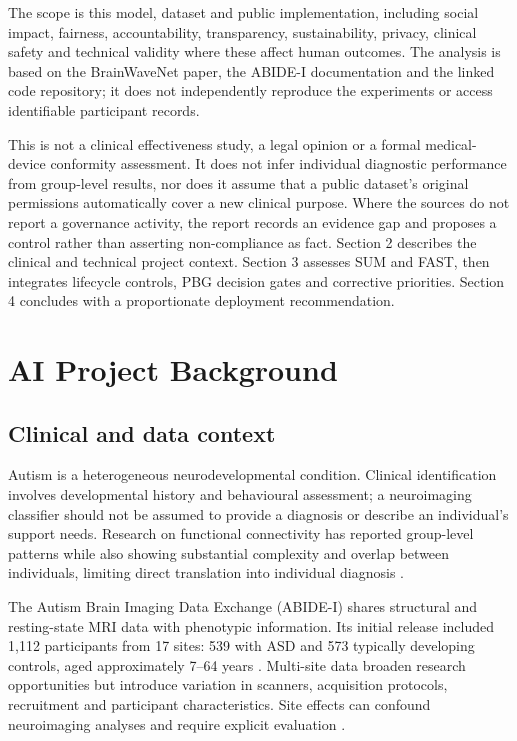\documentclass[11pt,a4paper]{article}
\let\cite\parencite
\begin{document}
The scope is this model, dataset and public implementation, including social impact, fairness, accountability, transparency, sustainability, privacy, clinical safety and technical validity where these affect human outcomes. The analysis is based on the BrainWaveNet paper, the ABIDE-I documentation and the linked code repository; it does not independently reproduce the experiments or access identifiable participant records.

This is not a clinical effectiveness study, a legal opinion or a formal medical-device conformity assessment. It does not infer individual diagnostic performance from group-level results, nor does it assume that a public dataset's original permissions automatically cover a new clinical purpose. Where the sources do not report a governance activity, the report records an evidence gap and proposes a control rather than asserting non-compliance as fact. Section 2 describes the clinical and technical project context. Section 3 assesses SUM and FAST, then integrates lifecycle controls, PBG decision gates and corrective priorities. Section 4 concludes with a proportionate deployment recommendation.

\section{AI Project Background}
\subsection{Clinical and data context}
Autism is a heterogeneous neurodevelopmental condition. Clinical identification involves developmental history and behavioural assessment; a neuroimaging classifier should not be assumed to provide a diagnosis or describe an individual's support needs. Research on functional connectivity has reported group-level patterns while also showing substantial complexity and overlap between individuals, limiting direct translation into individual diagnosis \cite{holiga2019}.

The Autism Brain Imaging Data Exchange (ABIDE-I) shares structural and resting-state MRI data with phenotypic information. Its initial release included 1,112 participants from 17 sites: 539 with ASD and 573 typically developing controls, aged approximately 7--64 years \cite{dimartino2014,abidewebsite}. Multi-site data broaden research opportunities but introduce variation in scanners, acquisition protocols, recruitment and participant characteristics. Site effects can confound neuroimaging analyses and require explicit evaluation \cite{abraham2017,abideharmonization2022}.
\end{document}
